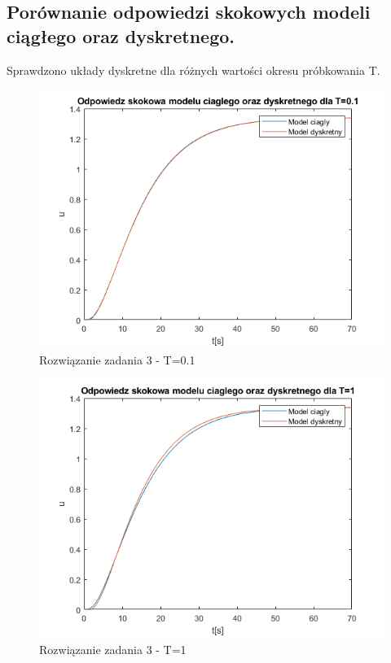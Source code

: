 \subsection{Porównanie odpowiedzi skokowych modeli ciągłego oraz dyskretnego.}
Sprawdzono układy dyskretne dla różnych wartości okresu próbkowania T.
\begin{figure}[H]
\centering
\includegraphics[width=15cm]{images/1.png}
\caption{Rozwiązanie zadania 3 - T=0.1}
\label{fig:1}
\end{figure}
\begin{figure}[H]
\centering
\includegraphics[width=15cm]{images/2.png}
\caption{Rozwiązanie zadania 3 - T=1}
\label{fig:2}
\end{figure}
